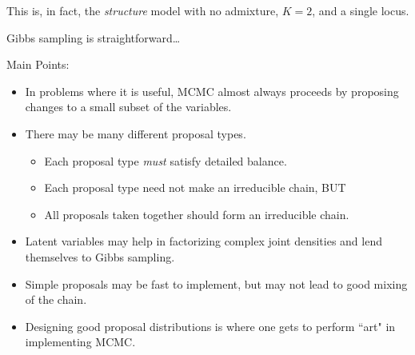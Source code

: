 This is, in fact, the {\em structure} model with no admixture, $K=2$, and a single locus.

Gibbs sampling is straightforward\ldots\hfill{}

Main Points:
\begin{itemize}
\item In problems where it is useful, MCMC almost always proceeds by proposing changes to a small subset of the variables.
\item There may be many different proposal types.
\begin{itemize}
\item Each proposal type {\em must} satisfy detailed balance.
\item Each proposal type need not make an irreducible chain, BUT
\item All proposals taken together should form an irreducible chain.
\end{itemize}
\item Latent variables may help in factorizing complex joint densities and lend themselves to Gibbs sampling.
\item Simple proposals may be fast to implement, but may not lead to good mixing of the chain.
\item Designing good proposal distributions is where one gets to perform ``art" in implementing MCMC.
\end{itemize}

